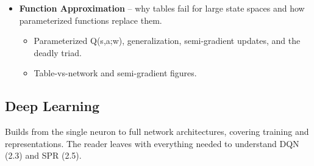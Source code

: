 \documentclass[11pt]{article}
\begin{document}
\begin{itemize}
\begin{itemize}[label=$\circ$, itemsep=0.2em, parsep=0pt, topsep=0pt, partopsep=0pt]
    vs exploitation, and epsilon-greedy.
  \item TD update figure, exploration figure, and worked
    arithmetic.
  \end{itemize}
\item \textbf{Function Approximation} -- why tables fail for large
  state spaces and how parameterized functions replace them.
  \begin{itemize}[label=$\circ$, itemsep=0.2em, parsep=0pt, topsep=0pt, partopsep=0pt]
  \item Parameterized Q(s,a;w), generalization, semi-gradient
    updates, and the deadly triad.
  \item Table-vs-network and semi-gradient figures.
  \end{itemize}
\end{itemize}

\subsection{Deep Learning}

\noindent Builds from the single neuron to full network architectures, covering
training and representations. The reader leaves with everything needed
to understand DQN (2.3) and SPR (2.5).
\end{document}

